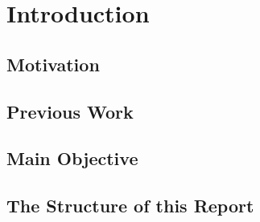 \chapter{Introduction}\label{sec:introduction}


\section{Motivation}\label{sec:motivation}


\section{Previous Work}\label{sec:previous-work}


\section{Main Objective}


\section{The Structure of this Report}\label{the-structure-of-this-report}

